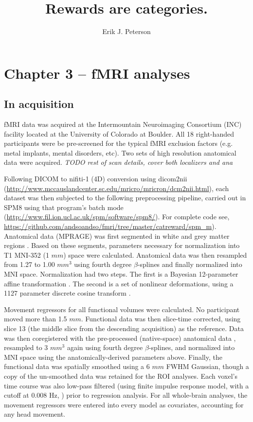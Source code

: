 \documentclass[doc,12pt]{apa}        %
\title{Rewards are categories.}
\author{Erik J. Peterson} \affiliation{Dept. of Psychology \\ Colorado State University \\ Fort Collins, CO}
\begin{document}
 
\maketitle
\doublespacing

\section{Chapter 3 -- fMRI analyses} %
\label{sec:task_and_models}
\subsection{In acquisition}
\label{sub:acquired}
fMRI data was acquired at the Intermountain Neuroimaging Consortium (INC) facility located at the University of Colorado at Boulder.  All 18 right-handed participants were be pre-screened for the typical fMRI exclusion factors (e.g. metal implants, mental disorders, etc).  Two sets of high resolution anatomical data were acquired. \emph{TODO rest of scan details, cover both localizers and ana}

Following DICOM to nifiti-1 (4D) conversion using dicom2nii (\url{http://www.mccauslandcenter.sc.edu/mricro/mricron/dcm2nii.html}), each dataset was then subjected to the following preprocessing pipeline, carried out in SPM8 using that program's batch mode (\url{http://www.fil.ion.ucl.ac.uk/spm/software/spm8/}).  For complete code see, \url{https://github.com/andsoandso/fmri/tree/master/catreward/spm\_m}).  Anatomical data (MPRAGE) was first segmented in white and grey matter regions \cite{Collignon:1995p9347}.  Based on these segments, parameters necessary for normalization into T1 MNI-352 (1 $mm$) space were calculated.  Anatomical data was then resampled from 1.27 to 1.00 $mm^3$ using fourth degree $\beta$-splines and finally normalized into MNI space.  Normalization had two steps.  The first is a Bayesian 12-parameter affine transformation \cite{Ashburner:1997p9348}.  The second is a set of nonlinear deformations, using a 1127 parameter discrete cosine transform \cite{Ashburner:1999p9350}. 

Movement regressors for all functional volumes were calculated.  No participant moved more than 1.5 $mm$. Functional data was then slice-time corrected, using slice 13 (the middle slice from the descending acquisition) as the reference. Data was then coregistered with the pre-processed (native-space) anatomical data \cite{Collignon:1995p9347}, resampled to 3 $mm^3$ again using fourth degree $\beta$-splines, and normalized into MNI space using the anatomically-derived parameters above.  Finally, the functional data was spatially smoothed using a 6 $mm$ FWHM Gaussian, though a copy of the un-smoothed data was retained for the ROI analyses.  Each voxel's time course was also low-pass filtered (using finite impulse response model, with a cutoff at 0.008 Hz, \cite{Kruggel:1999p9351}) prior to regression analysis.  For all whole-brain analyses, the movement regressors were entered into every model as covariates, accounting for any head movement.
\end{document}
